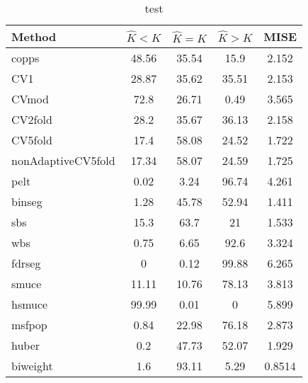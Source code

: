 \begin{table}[ht]
\centering
\begin{tabular}{l|cccc}
  \hline
Method & $\hat{K} < K$ & $\hat{K} = K$ & $\hat{K} > K$ & MISE \\ 
  \hline
copps & 48.56 & 35.54 &  15.9 & 2.152 \\ 
  CV1 & 28.87 & 35.62 & 35.51 & 2.153 \\ 
  CVmod &  72.8 & 26.71 &  0.49 & 3.565 \\ 
  CV2fold &  28.2 & 35.67 & 36.13 & 2.158 \\ 
  CV5fold &  17.4 & 58.08 & 24.52 & 1.722 \\ 
  nonAdaptiveCV5fold & 17.34 & 58.07 & 24.59 & 1.725 \\ 
  pelt &  0.02 &  3.24 & 96.74 & 4.261 \\ 
  binseg &  1.28 & 45.78 & 52.94 & 1.411 \\ 
  sbs &  15.3 &  63.7 &    21 & 1.533 \\ 
  wbs &  0.75 &  6.65 &  92.6 & 3.324 \\ 
  fdrseg &     0 &  0.12 & 99.88 & 6.265 \\ 
  smuce & 11.11 & 10.76 & 78.13 & 3.813 \\ 
  hsmuce & 99.99 &  0.01 &     0 & 5.899 \\ 
  msfpop &  0.84 & 22.98 & 76.18 & 2.873 \\ 
  huber &   0.2 & 47.73 & 52.07 & 1.929 \\ 
  biweight &   1.6 & 93.11 &  5.29 & 0.8514 \\ 
   \hline
\end{tabular}
\caption{test} 
\end{table}
